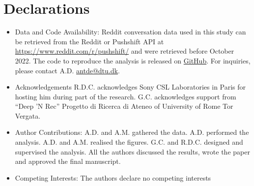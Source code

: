 \documentclass[fleqn,10pt]{wlscirep}
\begin{document}


\section*{Declarations}
\begin{itemize}
\item Data and Code Availability:
Reddit conversation data used in this study can be retrieved from the Reddit or Pushshift API at \url{https://www.reddit.com/r/pushshift/} and were retrieved before October 2022.
The code to reproduce the analysis is released on \href{https://github.com/ComplexConnectionsLab/Recurrent_Patterns_Reddit/}{GitHub}.
For inquiries, please contact A.D. \url{antde@dtu.dk}.
\item Acknowledgements
R.D.C. acknowledges Sony CSL Laboratories in Paris for hosting him during part of the research.
G.C. acknowledges support from “Deep ’N Rec” Progetto di Ricerca di Ateneo of University of Rome Tor Vergata. 
\item Author Contributions:
A.D. and A.M. gathered the data.
A.D. performed the analysis.
A.D. and A.M. realised the figures.
G.C. and R.D.C. designed and supervised the analysis.
All the authors discussed the results, wrote the paper and approved the final manuscript.
\item Competing Interests:
The authors declare no competing interests
\end{itemize}



\pagebreak[2]
\clearpage
\renewcommand{\figurename}{Supplementary Figure}
\renewcommand{\tablename}{Supplementary Table}
\setcounter{figure}{0}
\renewcommand{\thefigure}{S\arabic{figure}}
\renewcommand{\thetable}{S\arabic{table}}
\end{document}

